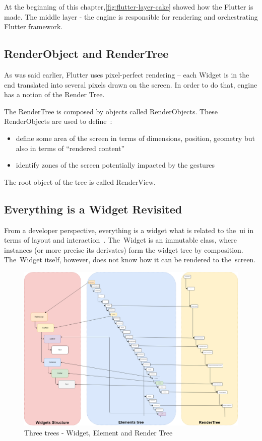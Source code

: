 At the beginning of this chapter,\cref{fig:flutter-layer-cake} showed how the Flutter is made. The middle layer - the engine is responsible for rendering and orchestrating Flutter framework. 
\subsection{RenderObject and RenderTree}
As was said earlier, Flutter uses pixel-perfect rendering -- each Widget is in the end translated into several pixels drawn on the screen. In order to do that, engine has a notion of the Render Tree.

The RenderTree is composed by objects called RenderObjects. These RenderObjects are used to define~\cite{didier-internals}:
\begin{itemize}
    \item define some area of the screen in terms of dimensions, position, geometry but also in terms of ``rendered content''
    \item identify zones of the screen potentially impacted by the gestures
\end{itemize}
The root object of the tree is called RenderView.
\subsection{Everything is a Widget Revisited}
From a developer perspective, everything is a widget what is related to the~\gls{ui} in terms of layout and interaction~\cite{didier-internals}. The~Widget is an immutable class, where instances (or more precise its derivates) form the widget tree by composition. The~Widget itself, however, does not know how it can be rendered to the~screen. 

\begin{figure}[ht]
    \centering
    \includegraphics[width=0.75\linewidth]{img/flutter/internals_3_trees.png}
    \caption{Three trees - Widget, Element and Render Tree}
    \label{fig:flutter-internal-3-trees}
\end{figure}

